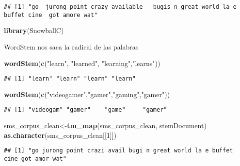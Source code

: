 \documentclass[]{article}
\newenvironment{Shaded}{\begin{snugshade}}{\end{snugshade}}
\newcommand{\KeywordTok}[1]{\textcolor[rgb]{0.13,0.29,0.53}{\textbf{#1}}}
\newcommand{\DecValTok}[1]{\textcolor[rgb]{0.00,0.00,0.81}{#1}}
\newcommand{\StringTok}[1]{\textcolor[rgb]{0.31,0.60,0.02}{#1}}
\newcommand{\NormalTok}[1]{#1}
\begin{document}
\begin{verbatim}
## [1] "go  jurong point crazy available   bugis n great world la e buffet cine  got amore wat"
\end{verbatim}

\begin{Shaded}
\begin{Highlighting}[]
\KeywordTok{library}\NormalTok{(SnowballC)}
\end{Highlighting}
\end{Shaded}

WordStem nos saca la radical de las palabras

\begin{Shaded}
\begin{Highlighting}[]
\KeywordTok{wordStem}\NormalTok{(}\KeywordTok{c}\NormalTok{(}\StringTok{"learn"}\NormalTok{, }\StringTok{"learned"}\NormalTok{, }\StringTok{"learning"}\NormalTok{,}\StringTok{"learns"}\NormalTok{))}
\end{Highlighting}
\end{Shaded}

\begin{verbatim}
## [1] "learn" "learn" "learn" "learn"
\end{verbatim}

\begin{Shaded}
\begin{Highlighting}[]
\KeywordTok{wordStem}\NormalTok{(}\KeywordTok{c}\NormalTok{(}\StringTok{"videogamer"}\NormalTok{,}\StringTok{"gamer"}\NormalTok{,}\StringTok{"gaming"}\NormalTok{,}\StringTok{"gamer"}\NormalTok{))}
\end{Highlighting}
\end{Shaded}

\begin{verbatim}
## [1] "videogam" "gamer"    "game"     "gamer"
\end{verbatim}

\begin{Shaded}
\begin{Highlighting}[]
\NormalTok{sms_corpus_clean<-}\KeywordTok{tm_map}\NormalTok{(sms_corpus_clean, stemDocument)}
\KeywordTok{as.character}\NormalTok{(sms_corpus_clean[[}\DecValTok{1}\NormalTok{]])}
\end{Highlighting}
\end{Shaded}

\begin{verbatim}
## [1] "go jurong point crazi avail bugi n great world la e buffet cine got amor wat"
\end{verbatim}
\end{document}
